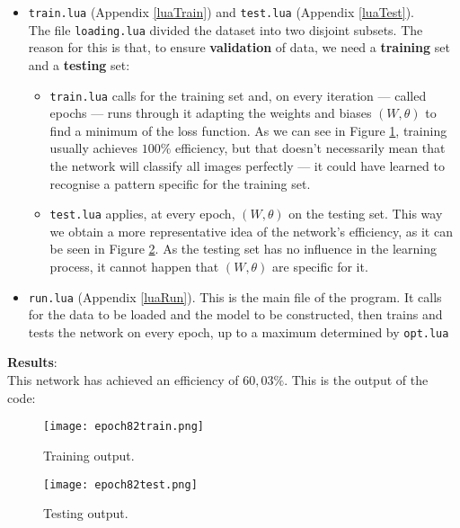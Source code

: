 \documentclass[titlepage]{article}
\theoremstyle{plain}
\theoremstyle{definition}
\begin{document}
\begin{itemize}
			\item \texttt{train.lua} (Appendix \ref{luaTrain}) and \texttt{test.lua} (Appendix \ref{luaTest}).\\
			The file \texttt{loading.lua} divided the dataset into two disjoint subsets. The reason for this is that, to ensure \textbf{validation} of data, we need a \textbf{training} set and a \textbf{testing} set: 
			\begin{itemize}
				\item \texttt{train.lua} calls for the training set and, on every iteration --- called epochs --- runs through it adapting the weights and biases $(W,\theta)$ to find a minimum of the loss function. As we can see in Figure \ref{fig:epoch82train}, training usually achieves $100\%$ efficiency, but that doesn't necessarily mean that the network will classify all images perfectly --- it could have learned to recognise a pattern specific for the training set.
				\item \texttt{test.lua} applies, at every epoch, $(W,\theta)$ on the testing set. This way we obtain a more representative idea of the network's efficiency, as it can be seen in Figure \ref{fig:epoch82test}. As the testing set has no influence in the learning process, it cannot happen that $(W,\theta)$ are specific for it.
			\end{itemize}
			
			\item \texttt{run.lua} (Appendix \ref{luaRun}).
			This is the main file of the program. It calls for the data to be loaded and the model to be constructed, then trains and tests the network on every epoch, up to a maximum determined by \texttt{opt.lua}
		\end{itemize}
		\newpage
		\textbf{Results}:\\
		This network has achieved an efficiency of $60,03\%$. This is the output of the code:
		\begin{figure}[H]
			\centering
			\texttt{[image: epoch82train.png]}
			\caption{Training output.}
			\label{fig:epoch82train}
		\end{figure}
		\begin{figure}[H]
			\centering
			\texttt{[image: epoch82test.png]}
			\caption{Testing output.}
			\label{fig:epoch82test}
		\end{figure}
		
\end{document}
